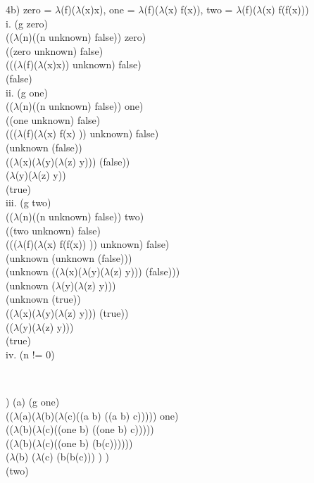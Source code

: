 \documentclass[12pt]{article}
\begin{document}
\noindent 4b) zero = $\lambda$(f)($\lambda$(x)x), one = $\lambda$(f)($\lambda$(x) f(x)), two = $\lambda$(f)($\lambda$(x) f(f(x)))\\
i. (g zero)\\
(($\lambda$(n)((n unknown) false)) zero)\\
((zero unknown) false)\\
((($\lambda$(f)($\lambda$(x)x)) unknown) false)\\
(false)\\

\noindent ii. (g one)\\
(($\lambda$(n)((n unknown) false)) one)\\
((one unknown) false)\\
((($\lambda$(f)($\lambda$(x) f(x) )) unknown) false)\\
(unknown (false))\\
(($\lambda$(x)($\lambda$(y)($\lambda$(z) y))) (false))\\
($\lambda$(y)($\lambda$(z) y))\\
(true)\\

\noindent iii. (g two)\\
(($\lambda$(n)((n unknown) false)) two)\\
((two unknown) false)\\
((($\lambda$(f)($\lambda$(x) f(f(x)) )) unknown) false)\\
(unknown (unknown (false)))\\
(unknown (($\lambda$(x)($\lambda$(y)($\lambda$(z) y))) (false)))\\
(unknown ($\lambda$(y)($\lambda$(z) y)))\\
(unknown (true))\\
(($\lambda$(x)($\lambda$(y)($\lambda$(z) y))) (true))\\
(($\lambda$(y)($\lambda$(z) y)))\\
(true)\\

\noindent iv. (n != 0)

\hrulefill \\
\pagebreak 

)
(a) (g one)\\
(($\lambda$(a)($\lambda$(b)($\lambda$(c)((a b) ((a b) c))))) one)\\
(($\lambda$(b)($\lambda$(c)((one b) ((one b) c)))))\\
(($\lambda$(b)($\lambda$(c)((one b) (b(c))))))\\
($\lambda$(b) ($\lambda$(c) (b(b(c))) ) )\\
(two)\\
\end{document}
